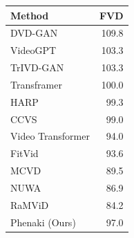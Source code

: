 \begin{table}
\begin{minipage}{.45\linewidth}
\begin{center}
\begin{tabular}{lr}
                Method  & FVD  \\
                \hline
                DVD-GAN \cite{clark2019adversarial}                & 109.8 \\
                VideoGPT \cite{videogpt}             & 103.3 \\
                TrIVD-GAN \cite{trIVD}               & 103.3 \\
                Transframer  \cite{transframer}      & 100.0 \\
                HARP \cite{harp}                     & 99.3 \\
                CCVS  \cite{ccvs}                    & 99.0 \\
                Video Transformer \cite{videotranf}  & 94.0 \\
                FitVid \cite{fitvid}                 & 93.6 \\
                MCVD \cite{mcvd}                     & 89.5 \\
                NUWA \cite{nuwa}                     & 86.9 \\
                RaMViD  \cite{diff4pred}             & 84.2 \\
                \hline
                Phenaki (Ours)                       & 97.0 \\
            \end{tabular}
        \end{center}

    \end{minipage}
    
\end{table}